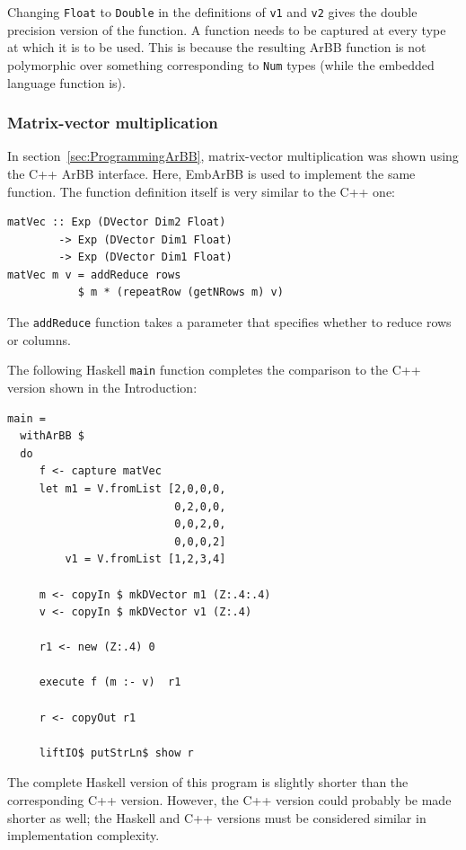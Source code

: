 
Changing {\tt Float} to {\tt Double} in the definitions 
of {\tt v1} and {\tt v2} gives the double precision version of the function.
A function needs to be captured at every type at which it is to be used. This 
is because the resulting ArBB function is not polymorphic over something corresponding 
to {\tt Num} types (while the embedded language function is). 

\subsubsection{Matrix-vector multiplication} 
In section~\ref{sec:ProgrammingArBB}, matrix-vector multiplication was shown using the C++ ArBB interface. 
Here, EmbArBB is used to implement the same function. The function definition itself 
is very similar to the C++ one:

\begin{verbatim} 
matVec :: Exp (DVector Dim2 Float) 
        -> Exp (DVector Dim1 Float) 
        -> Exp (DVector Dim1 Float) 
matVec m v = addReduce rows 
           $ m * (repeatRow (getNRows m) v)

\end{verbatim} 

The {\tt addReduce} function takes a parameter that specifies whether to reduce 
rows or columns. 


The following Haskell {\tt main} function completes the comparison to the C++ version shown in the Introduction:

\begin{verbatim}
main =  
  withArBB $ 
  do 
     f <- capture matVec  
     let m1 = V.fromList [2,0,0,0,
                          0,2,0,0,
                          0,0,2,0,
                          0,0,0,2]
         v1 = V.fromList [1,2,3,4] 
     
     m <- copyIn $ mkDVector m1 (Z:.4:.4) 
     v <- copyIn $ mkDVector v1 (Z:.4) 

     r1 <- new (Z:.4) 0 

     execute f (m :- v)  r1
              
     r <- copyOut r1
              
     liftIO$ putStrLn$ show r
\end{verbatim}
The complete Haskell version of this program is slightly shorter than the corresponding 
C++ version. However, the C++ version could probably be made shorter as well; the Haskell and C++ versions must be considered similar in implementation complexity. 


